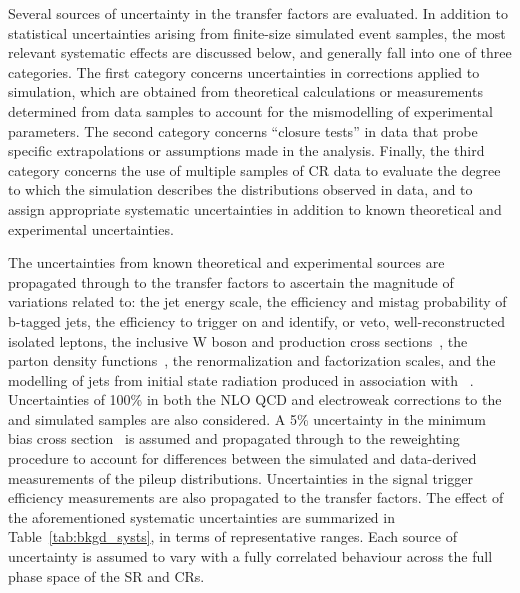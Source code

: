 Several sources of uncertainty in the transfer factors are evaluated.
In addition to statistical uncertainties arising from finite-size
simulated event samples, the most relevant systematic effects are
discussed below, and generally fall into one of three categories. The
first category concerns uncertainties in corrections applied to
simulation, which are obtained from theoretical calculations or
measurements determined from data samples to account for the
mismodelling of experimental parameters. The second category concerns
``closure tests'' in data that probe specific extrapolations or
assumptions made in the analysis. Finally, the third category concerns
the use of multiple samples of CR data to evaluate the degree to which
the simulation describes the \mht distributions observed in data, and
to assign appropriate systematic uncertainties in addition to known
theoretical and experimental uncertainties.

The uncertainties from known theoretical and experimental sources are
propagated through to the transfer factors to ascertain the magnitude
of variations related to: the jet energy scale, the efficiency and
mistag probability of b-tagged jets, the efficiency to trigger on and
identify, or veto, well-reconstructed isolated leptons, the inclusive
W boson and \ttbar production cross sections~\cite{}, the parton
density functions~\cite{}, the renormalization and factorization
scales, and the modelling of jets from initial state radiation
produced in association with \ttbar~\cite{}. Uncertainties of 100\% in
both the NLO QCD and electroweak corrections to the \wj and \zj
simulated samples are also considered. A 5\% uncertainty in the
minimum bias cross section~\cite{} is assumed and propagated through
to the reweighting procedure to account for differences between the
simulated and data-derived measurements of the pileup
distributions. Uncertainties in the signal trigger efficiency
measurements are also propagated to the transfer factors. The effect
of the aforementioned systematic uncertainties are summarized in
Table~\ref{tab:bkgd_systs}, in terms of representative ranges.  Each
source of uncertainty is assumed to vary with a fully correlated
behaviour across the full phase space of the SR and CRs.

